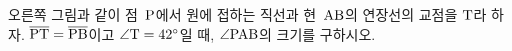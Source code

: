 \noindent\begin{minipage}[t]{0.58\linewidth}\vspace{0pt}\raggedright 오른쪽 그림과 같이 점~$\mathrm{P}$에서 원에 접하는 직선과 현~$\mathrm{AB}$의 연장선의 교점을 $\mathrm{T}$라 하자. $\overline{\mathrm{PT}}=\overline{\mathrm{PB}}$이고 $\angle\mathrm{T}=42^\circ$일 때, $\angle\mathrm{PAB}$의 크기를 구하시오.\end{minipage}\hfill\begin{minipage}[t]{0.4\linewidth}\vspace{0pt}\centering \resizebox{\ifdim\width>\linewidth\linewidth\else\width\fi}{!}{}\end{minipage}\par
